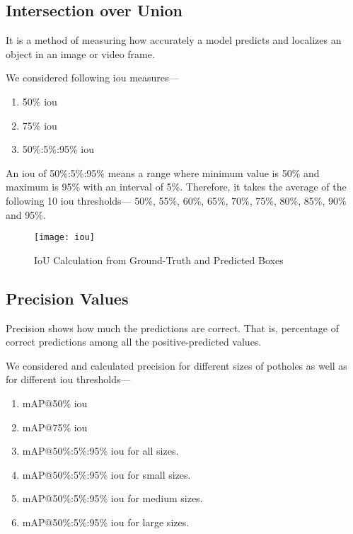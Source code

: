        \subsection{Intersection over Union}
            It is a method of measuring how accurately a model predicts and localizes an object in an image or video frame\cite{rahman2016optimizing}.
            
            We considered following \acrshort{iou} measures---
            \begin{enumerate}
            \item 50\% \acrshort{iou}
            \item 75\% \acrshort{iou}
            \item 50\%:5\%:95\% \acrshort{iou}\cite{lin2014microsoft}
            \end{enumerate}
            An \acrshort{iou} of 50\%:5\%:95\% means a range where minimum value is 50\% and maximum is 95\% with an interval of 5\%. Therefore, it takes the average of the following 10 \acrshort{iou} thresholds\cite{lin2014microsoft}--- 50\%, 55\%, 60\%, 65\%, 70\%, 75\%, 80\%, 85\%, 90\% and 95\%.
            
            \begin{figure}
                \centering
                \texttt{[image: iou]}
                \caption{IoU Calculation from Ground-Truth and Predicted Boxes}
                \label{fig:iou_calculation}
            \end{figure}

        \subsection{Precision Values}
            Precision shows how much the predictions are correct\cite{buckland1994relationship}. That is, percentage of correct predictions among all the positive-predicted values.

            We considered and calculated precision for different  sizes of potholes as well as for different \acrshort{iou} thresholds---
            \begin{enumerate}
             \item mAP@50\% \acrshort{iou}
             \item mAP@75\% \acrshort{iou}
             \item mAP@50\%:5\%:95\% \acrshort{iou} for all sizes.
             \item mAP@50\%:5\%:95\% \acrshort{iou} for small sizes.
             \item mAP@50\%:5\%:95\% \acrshort{iou} for medium sizes.
             \item mAP@50\%:5\%:95\% \acrshort{iou} for large sizes.
            \end{enumerate}
            
